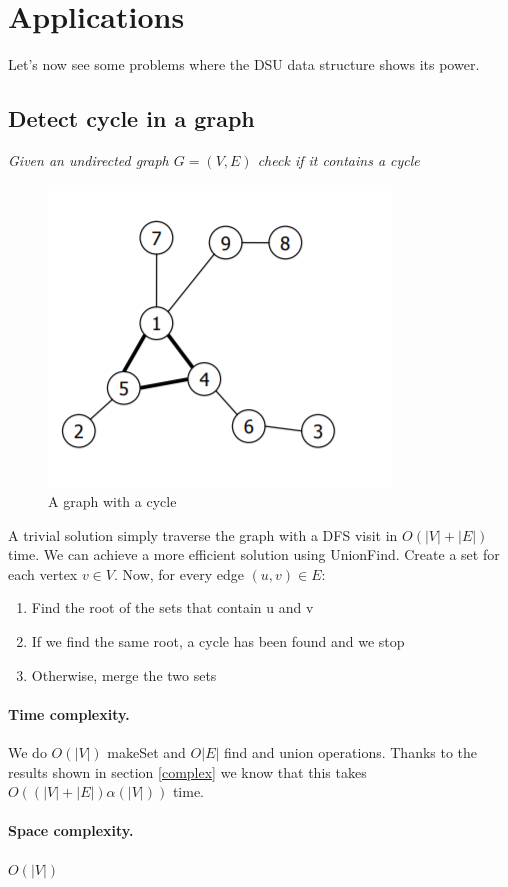 \documentclass{article}
\begin{document}
\section{Applications}
Let's now see some problems where the DSU data structure shows its power.
\subsection{Detect cycle in a graph} \label{loop}
\emph{Given an undirected graph $G = (V, E)$ check if it contains a cycle}
\begin{figure}[h!]
    \centering
    \includegraphics[scale=0.5]{img/cycle.png}
    \caption{A graph with a cycle}
\end{figure}
\bigskip

A trivial solution simply traverse the graph with a DFS visit in $O(|V| + |E|)$
time. We can achieve a more efficient solution using UnionFind. Create a set for each
vertex $v \in V$. Now, for every edge $ (u,v) \in E$:\begin{enumerate}
    \item Find the root  of the sets that contain u and v
    \item If we find  the same root, a cycle has been found and we stop 
    \item Otherwise, merge the two sets
\end{enumerate}

\paragraph{Time complexity.} We do $O(|V|)$ makeSet  and  $O|E|$ find and  union operations.
Thanks  to the results shown in section \ref{complex} we know that this takes $O((|V| + |E|)\alpha(|V|))$ time. 
\paragraph{Space complexity.} $O(|V|)$

\end{document}
